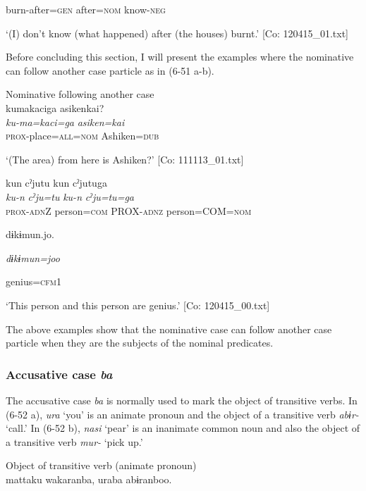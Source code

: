       burn-after=\textsc{gen}  after=\textsc{nom}  know-\textsc{neg}

\glt ‘(I) don’t know (what happened) after (the houses) burnt.’ [Co: 120415\_01.txt]
\z

  Before concluding this section, I will present the examples where the nominative can follow another case particle as in (6-51 a-b).

\ea\label{ex:6-51}
 Nominative following another case\\

 \ea {\TM}  kumakaciga  asikenkai?\\
\gll \textit{ku-ma=kaci=ga}  \textit{asiken=kai}\\

      \textsc{prox}-place=\textsc{all}=\textsc{nom}  Ashiken=\textsc{dub}

\glt ‘(The area) from here is Ashiken?’ [Co: 111113\_01.txt]
\z

 \ex {\TM}  kun  cˀjutu  kun  cˀjutuga\\
\gll \textit{ku-n}  \textit{cˀju=tu}  \textit{ku-n}  \textit{cˀju=tu=ga}\\

      \textsc{prox}-\textsc{adn}Z  person=\textsc{com}  PROX-\textsc{adnz}  person=COM=\textsc{nom}

      dɨkɨmun.jo.

      \textit{dɨkɨmun=joo}

      genius=\textsc{cfm}1

\glt ‘This person and this person are genius.’ [Co: 120415\_00.txt]
\z

The above examples show that the nominative case can follow another case particle when they are the subjects of the nominal predicates.

\subsubsection{Accusative case \textit{ba}}

The accusative case \textit{ba} is normally used to mark the object of transitive verbs. In (6-52 a), \textit{ura} ‘you’ is an animate pronoun and the object of a transitive verb \textit{abɨr-} ‘call.’ In (6-52 b), \textit{nasi} ‘pear’ is an inanimate common noun and also the object of a transitive verb \textit{mur{}-} ‘pick up.’

\ea\label{ex:6-52}
\ea Object of transitive verb (animate pronoun)\\
{\TM}
\gll  mattaku  wakaranba,  uraba  abɨranboo.\\

